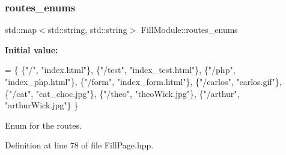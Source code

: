 \subsubsection{\texorpdfstring{routes\+\_\+enums}{routes\_enums}}
{\footnotesize\ttfamily std\+::map$<$std\+::string, std\+::string$>$ Fill\+Module\+::routes\+\_\+enums}

{\bfseries Initial value\+:}
\begin{DoxyCode}
= \{
        \{\textcolor{stringliteral}{"/"},       \textcolor{stringliteral}{"index.html"}\},
        \{\textcolor{stringliteral}{"/test"},   \textcolor{stringliteral}{"index\_test.html"}\},
        \{\textcolor{stringliteral}{"/php"},    \textcolor{stringliteral}{"index\_php.html"}\},
        \{\textcolor{stringliteral}{"/form"},   \textcolor{stringliteral}{"index\_form.html"}\},
        \{\textcolor{stringliteral}{"/carlos"}, \textcolor{stringliteral}{"carlos.gif"}\},
        \{\textcolor{stringliteral}{"/cat"},    \textcolor{stringliteral}{"cat\_choc.jpg"}\},
        \{\textcolor{stringliteral}{"/theo"},   \textcolor{stringliteral}{"theoWick.jpg"}\},
        \{\textcolor{stringliteral}{"/arthur"}, \textcolor{stringliteral}{"arthurWick.jpg"}\}
    \}
\end{DoxyCode}


Enum for the routes. 



Definition at line 78 of file Fill\+Page.\+hpp.

